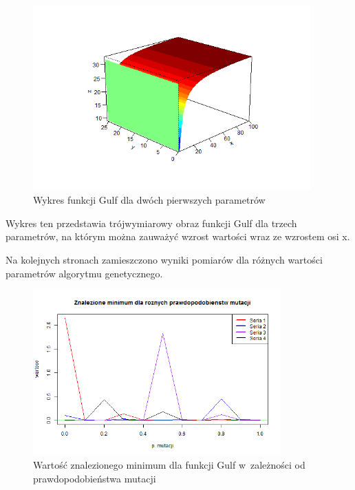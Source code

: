 \documentclass[11pt, a4paper]{article}
\newcommand{\fbi}{\leavevmode{\parindent=1em\indent}}
\begin{document}
\begin{figure}[H]
	\begin{center}
		\includegraphics[width=0.95\textwidth]{./assets/Gulf1.png}
		\caption{Wykres funkcji Gulf dla dwóch pierwszych parametrów}
		\label{fig:gulf1}
	\end{center}
\end{figure}

\fbi
Wykres ten przedstawia trójwymiarowy obraz funkcji Gulf dla trzech parametrów, na którym można zauważyć wzrost wartości wraz ze wzrostem osi x.

\fbi
Na kolejnych stronach zamieszczono wyniki pomiarów dla różnych wartości parametrów algorytmu genetycznego.

\begin{figure}[H]
	\begin{center}
		\includegraphics[width=0.85\textwidth]{./assets/Gulf2.png}
		\caption{Wartość znalezionego minimum dla funkcji Gulf w~zależności od prawdopodobieństwa mutacji}
		\label{fig:gulf2}
	\end{center}
\end{figure}
\end{document}
